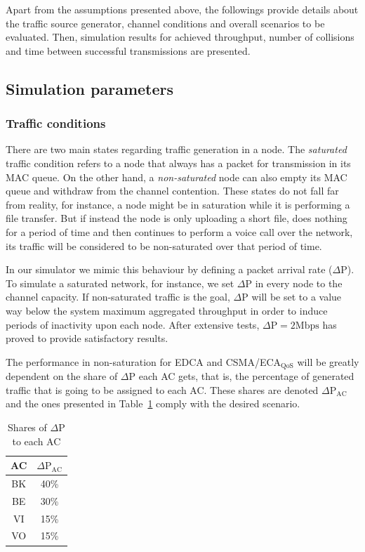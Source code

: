 Apart from the assumptions presented above, the followings provide details about the traffic source generator, channel conditions and overall scenarios to be evaluated. Then, simulation results for achieved throughput, number of collisions and time between successful transmissions are presented.

\subsection{Simulation parameters}\label{subsect:simParams}
\subsubsection{Traffic conditions}
There are two main states regarding traffic generation in a node. The \emph{saturated} traffic condition refers to a node that always has a packet for transmission in its MAC queue. On the other hand, a \emph{non-saturated} node  can also empty its MAC queue and withdraw from the channel contention. These states do not fall far from reality, for instance, a node might be in saturation while it is performing a file transfer. But if instead the node is only uploading a short file, does nothing for a period of time and then continues to perform a voice call over the network, its traffic will be considered to be non-saturated over that period of time.

In our simulator we mimic this behaviour by defining a packet arrival rate ($\Delta\text{P}$). To simulate a saturated network, for instance, we set $\Delta\text{P}$ in every node to the channel capacity. If non-saturated traffic is the goal, $\Delta\text{P}$ will be set to a value way below the system maximum aggregated throughput in order to induce periods of inactivity upon each node. After extensive tests, $\Delta\text{P}=2\text{Mbps}$ has proved to provide satisfactory results.

The performance in non-saturation for EDCA and CSMA/ECA$_{\text{QoS}}$ will be greatly dependent on the share of $\Delta\text{P}$ each AC gets, that is, the percentage of generated traffic that is going to be assigned to each AC. These shares are denoted $\Delta\text{P}_{\text{AC}}$ and the ones presented in Table~\ref{tab:pacShares} comply with the desired scenario.

	\begin{table}
		\centering
		\caption{Shares of $\Delta\text{P}$ to each AC}
		\label{tab:pacShares}
		\begin{tabular}{|c|c|}
			\hline
			{\bfseries AC} & {\bfseries $\Delta\text{P}_{\text{AC}}$}\\
			\hline
			BK	&	40\%\\
			\hline
			BE	&	30\%\\
			\hline
			VI	&	15\%\\
			\hline
			VO	&	15\%\\
			\hline
		\end{tabular}
	\end{table}
	
